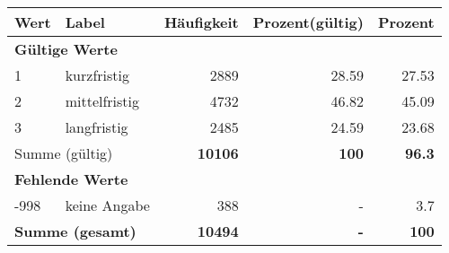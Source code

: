      \begin{longtable}{lXrrr}
     \toprule
     \textbf{Wert} & \textbf{Label} & \textbf{Häufigkeit} & \textbf{Prozent(gültig)} & \textbf{Prozent} \\
     \endhead
     \midrule
     \multicolumn{5}{l}{\textbf{Gültige Werte}}\\

     1 &
     \multicolumn{1}{X}{ kurzfristig   } &


       \num{2889} &
       \num[round-mode=places,round-precision=2]{28,59} &
         \num[round-mode=places,round-precision=2]{27,53} \\

     2 &
     \multicolumn{1}{X}{ mittelfristig   } &


       \num{4732} &
       \num[round-mode=places,round-precision=2]{46,82} &
         \num[round-mode=places,round-precision=2]{45,09} \\

     3 &
     \multicolumn{1}{X}{ langfristig   } &


       \num{2485} &
       \num[round-mode=places,round-precision=2]{24,59} &
         \num[round-mode=places,round-precision=2]{23,68} \\
     \midrule
     \multicolumn{2}{l}{Summe (gültig)} &
       \textbf{\num{10106}} &
     \textbf{100} &
       \textbf{\num[round-mode=places,round-precision=2]{96,3}} \\
     \multicolumn{5}{l}{\textbf{Fehlende Werte}}\\
       -998 &
       keine Angabe &
         \num{388} &
        - &
         \num[round-mode=places,round-precision=2]{3,7} \\
     \midrule
     \multicolumn{2}{l}{\textbf{Summe (gesamt)}} &
          \textbf{\num{10494}} &
        \textbf{-} &
        \textbf{100} \\
     \bottomrule
     \end{longtable}
     
